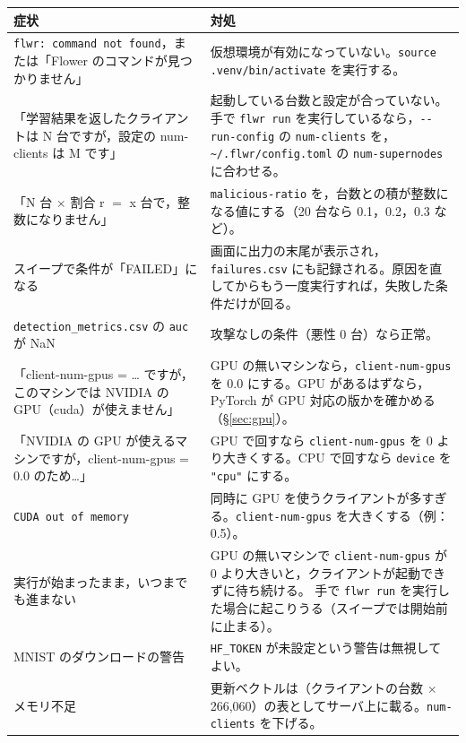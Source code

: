 \documentclass[a4j, dvipdfmx]{jsarticle}  %
\begin{document}
\begin{table}[H]
\centering
\begin{tabular}{@{}P{5.6cm} P{9.7cm}@{}}
\toprule
症状 & 対処 \\
\midrule
\texttt{flwr: command not found}，または「Flower のコマンドが見つかりません」 &
仮想環境が有効になっていない。\texttt{source .venv/bin/activate} を実行する。 \\
「学習結果を返したクライアントは N 台ですが，設定の num-clients は M です」 &
起動している台数と設定が合っていない。手で \texttt{flwr run} を実行しているなら，\texttt{-{}-run-config} の \texttt{num-clients} を，
\texttt{\textasciitilde/.flwr/config.toml} の \texttt{num-supernodes} に合わせる。 \\
「N 台 $\times$ 割合 r $=$ x 台で，整数になりません」 &
\texttt{malicious-ratio} を，台数との積が整数になる値にする（20 台なら 0.1，0.2，0.3 など）。 \\
スイープで条件が「FAILED」になる &
画面に出力の末尾が表示され，\texttt{failures.csv} にも記録される。原因を直してからもう一度実行すれば，失敗した条件だけが回る。 \\
\texttt{detection\_metrics.csv} の \texttt{auc} が NaN &
攻撃なしの条件（悪性 0 台）なら正常。 \\
「client-num-gpus = … ですが，このマシンでは NVIDIA の GPU（cuda）が使えません」 &
GPU の無いマシンなら，\texttt{client-num-gpus} を 0.0 にする。GPU があるはずなら，PyTorch が GPU 対応の版かを確かめる（\S\ref{sec:gpu}）。 \\
「NVIDIA の GPU が使えるマシンですが，client-num-gpus = 0.0 のため…」 &
GPU で回すなら \texttt{client-num-gpus} を 0 より大きくする。CPU で回すなら \texttt{device} を \texttt{"cpu"} にする。 \\
\texttt{CUDA out of memory} & 同時に GPU を使うクライアントが多すぎる。\texttt{client-num-gpus} を大きくする（例：0.5）。 \\
実行が始まったまま，いつまでも進まない & GPU の無いマシンで \texttt{client-num-gpus} が 0 より大きいと，クライアントが起動できずに待ち続ける。
手で \texttt{flwr run} を実行した場合に起こりうる（スイープでは開始前に止まる）。 \\
MNIST のダウンロードの警告 & \texttt{HF\_TOKEN} が未設定という警告は無視してよい。 \\
メモリ不足 & 更新ベクトルは（クライアントの台数 $\times$ 266{,}060）の表としてサーバ上に載る。\texttt{num-clients} を下げる。 \\
\bottomrule
\end{tabular}
\end{table}
\end{document}
